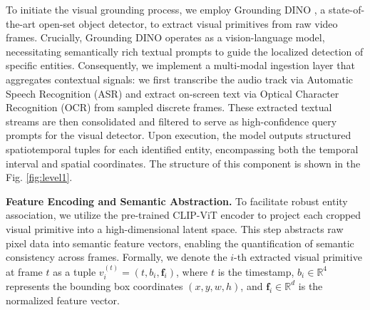 
To initiate the visual grounding process, we employ Grounding DINO \cite{groundingdino}, a state-of-the-art open-set object detector, to extract visual primitives from raw video frames. 
Crucially, Grounding DINO operates as a vision-language model, necessitating semantically rich textual prompts to guide the localized detection of specific entities. 
Consequently, we implement a multi-modal ingestion layer that aggregates contextual signals: we first transcribe the audio track via Automatic Speech Recognition (ASR) and extract on-screen text via Optical Character Recognition (OCR) from sampled discrete frames. 
These extracted textual streams are then consolidated and filtered to serve as high-confidence query prompts for the visual detector. 
Upon execution, the model outputs structured spatiotemporal tuples for each identified entity, encompassing both the temporal interval and spatial coordinates.
The structure of this component is shown in the Fig. \ref{fig:level1}.


\textbf{Feature Encoding and Semantic Abstraction.}
To facilitate robust entity association, we utilize the pre-trained CLIP-ViT \cite{clip} encoder to project each cropped visual primitive into a high-dimensional latent space. 
This step abstracts raw pixel data into semantic feature vectors, enabling the quantification of semantic consistency across frames. 
Formally, we denote the $i$-th extracted visual primitive at frame $t$ as a tuple $v_i^{(t)} = (t, b_i, \mathbf{f}_i)$, where $t$ is the timestamp, $b_i \in \mathbb{R}^4$ represents the bounding box coordinates $(x, y, w, h)$, and $\mathbf{f}_i \in \mathbb{R}^d$ is the normalized feature vector.

